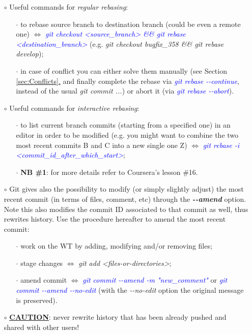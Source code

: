 \documentclass[a4paper,portrait,10pt]{article}   %
\newcommand{\mybulletlvA}{$\circ$}   %
\newcommand{\mybulletlvB}{$\cdot$}   %
\newcommand{\mydiv}{$\Leftrightarrow$ }   %
\newcommand{\mysapo}[1]{\textquotesingle #1\textquotesingle }   %
\newcommand{\mycmd}[1]{\textcolor{blue}{\textit{#1}}}   %
\newcommand{\myparvspace}{\vspace{4mm}}   %
\newcommand{\mysecvspace}{\vspace{6mm}}   %
\newcommand{\mysecref}[1]{\hyperref[#1]{\ref{#1}.}}   %
\begin{document}
\begin{itemize}
\item[\mybulletlvA] Useful commands for \textit{regular rebasing}:
\begin{itemize}
  \item[\mybulletlvB] to rebase source branch to destination branch (could be even a remote one) \mydiv \mycmd{git checkout <source\_branch> \&\& git rebase <destination\_branch>} (e.g. \textit{git checkout bugfix\_358 \&\& git rebase develop});
  \item[\mybulletlvB] in case of conflict you can either solve them manually (see Section \mysecref{sec:Conflicts} and finally complete the rebase via \mycmd{git rebase -{}-continue}, instead of the usual \textit{git commit ...}) or abort it (via \mycmd{git rebase -{}-abort}).
\end{itemize}
\myparvspace

\item[\mybulletlvA] Useful commands for \textit{interactive rebasing}:
\begin{itemize}
  \item[\mybulletlvB] to list current branch commits (starting from a specified one) in an editor in order to be modified (e.g. you might want to combine the two most recent commits \mysapo{B} and \mysapo{C} into a new single one \mysapo{Z}) \mydiv \mycmd{git rebase -i <commit\_id\_after\_which\_start>};
  \item[\mybulletlvB] \textbf{NB \#1}: for more details refer to Coursera's lesson \#16.
\end{itemize}
\myparvspace

\item[\mybulletlvA] Git gives also the possibility to modify (or simply slightly adjust) the most recent commit (in terms of files, comment, etc) through the \textbf{\textit{-{}-amend}} option. Note this also modifies the commit ID associated to that commit as well, thus rewrites history. Use the procedure hereafter to amend the most recent commit:
\begin{itemize}
  \item[\mybulletlvB] work on the WT by adding, modifying and/or removing files;
  \item[\mybulletlvB] stage changes \mydiv \textit{git add <files-or-directories>};
  \item[\mybulletlvB] amend commit \mydiv \mycmd{git commit -{}-amend -m "new\_comment"} or \mycmd{git commit -{}-amend -{}-no-edit} (with the \textit{-{}-no-edit} option the original message is preserved).
\end{itemize}
\myparvspace

\item[\mybulletlvA] \textbf{\underline{CAUTION}}: never rewrite history that has been already pushed and shared with other users!
\end{itemize}
\mysecvspace
\end{document}
